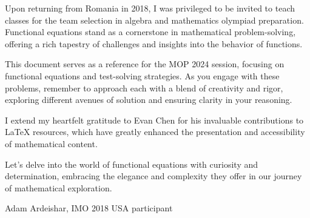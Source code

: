 \documentclass[11pt]{scrartcl}
\begin{document}




\thispagestyle{empty}


\newpage
\setcounter{page}{1}
\thispagestyle{plain}

    \thispagestyle{plain}
    {\huge {}}
    \vspace{2em}


    Upon returning from Romania in 2018, I was privileged to be invited to teach classes for the team selection in algebra and mathematics olympiad preparation. Functional equations stand as a cornerstone in mathematical problem-solving, offering a rich tapestry of challenges and insights into the behavior of functions.

    This document serves as a reference for the MOP 2024 session, focusing on functional equations and test-solving strategies. As you engage with these problems, remember to approach each with a blend of creativity and rigor, exploring different avenues of solution and ensuring clarity in your reasoning.

    I extend my heartfelt gratitude to Evan Chen for his invaluable contributions to LaTeX resources, which have greatly enhanced the presentation and accessibility of mathematical content.

    Let's delve into the world of functional equations with curiosity and determination, embracing the elegance and complexity they offer in our journey of mathematical exploration.
    \begin{flushright}
        Adam Ardeishar, IMO 2018 USA participant
    \end{flushright}
    \newpage
\end{document}
